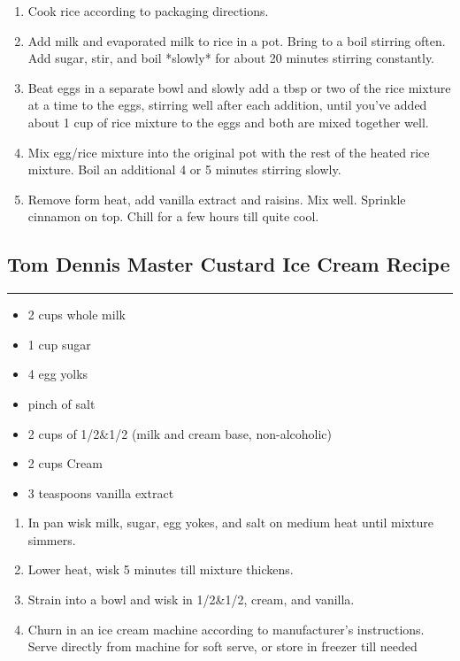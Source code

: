 \documentclass{article}
\begin{document}
\begin{enumerate}
    \item 
        Cook rice according to packaging directions.
    \item 
        Add milk and evaporated milk to rice in a pot. Bring to a boil stirring often. Add sugar, stir, and boil *slowly* for about 20 minutes stirring constantly. 
    \item 
        Beat eggs in a separate bowl and slowly add a tbsp or two of the rice mixture at a time to the eggs, stirring well after each addition, until you've added about 1 cup of rice mixture to the eggs and both are mixed together well. 
    \item 
        Mix egg/rice mixture into the original pot with the rest of the heated rice mixture. Boil an additional 4 or 5 minutes stirring slowly.
    \item 
        Remove form heat, add vanilla extract and raisins. Mix well. Sprinkle cinnamon on top. Chill for a few hours till quite cool.
\end{enumerate}
\newpage

\subsection{Tom Dennis Master Custard Ice Cream Recipe} 
\noindent\rule[0.5ex]{\linewidth}{1pt}

\begin{framed}
    \begin{itemize}
        \item 2 cups whole milk
        \item 1 cup sugar
        \item 4 egg yolks
        \item pinch of salt
        \item 2 cups of 1/2\&1/2 (milk and cream base, non-alcoholic)
        \item 2 cups Cream
        \item 3 teaspoons vanilla extract
    \end{itemize}
\end{framed}

\begin{enumerate}
    \item 
        In pan wisk milk, sugar, egg yokes, and salt on medium heat until mixture simmers.
    \item 
        Lower heat, wisk 5 minutes till mixture thickens.
    \item 
        Strain into a bowl and wisk in 1/2\&1/2, cream, and vanilla.
    \item 
        Churn in an ice cream machine according to manufacturer's instructions. Serve directly from machine for soft serve, or store in freezer till needed
\end{enumerate}
\end{document}
